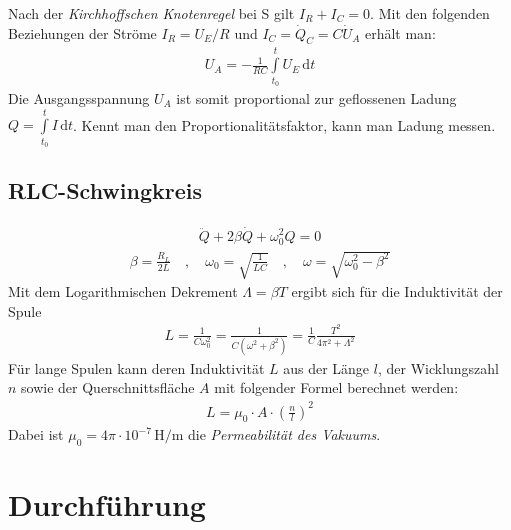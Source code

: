 \documentclass[12pt,a4paper,titlepage,headinclude,bibtotoc]{scrartcl}
\newcommand{\dif}{\ensuremath{\mathrm{d}}}
\begin{document}
Nach der \textit{Kirchhoffschen Knotenregel} bei S gilt $I_R+I_C=0$.
Mit den folgenden Beziehungen der Ströme $I_R=U_E/R$ und $I_C=\dot{Q}_C=C\dot{U}_A$ erhält man:
\begin{align}
	U_A=-\frac{1}{RC}\int \limits_{t_0}^t U_E \,\dif t
\end{align}
Die Ausgangsspannung $U_A$ ist somit proportional zur geflossenen Ladung $Q=\int \limits_{t_0}^t I \,\dif t$.
Kennt man den Proportionalitätsfaktor, kann man Ladung messen.

\subsection{RLC-Schwingkreis}

\begin{align}
	\ddot{Q}+2\beta\dot{Q}+\omega_0^2 Q=0
\end{align}
\begin{align*}
	\beta=\frac{R_L}{2L} \quad , \quad 
	\omega_0=\sqrt{\frac{1}{LC}} \quad , \quad
	\omega=\sqrt{\omega_0^2-\beta^2}
\end{align*}
Mit dem Logarithmischen Dekrement $\Lambda=\beta T$ ergibt sich für die Induktivität der Spule
\begin{align}
	L=\frac{1}{C\omega_0^2}=\frac{1}{C(\omega^2+\beta^2)}=\frac{1}{C}\frac{T^2}{4\pi^2+\Lambda^2}
	\label{eq:L}
\end{align}
Für lange Spulen kann deren Induktivität $L$ aus der Länge $l$, der Wicklungszahl $n$ sowie der Querschnittsfläche $A$ mit folgender Formel berechnet werden:
\begin{align}
	L=\mu_0 \cdot A \cdot \left(\frac{n}{l}\right)^2
	\label{eq:IndLangeSpule}
\end{align}
Dabei ist $\mu_0=4\pi\cdot 10^{-7}\, \si{\henry \per \meter}$ die \textit{Permeabilität des Vakuums}. 

\section{Durchführung}
\label{sec:durchfuehrung}
\end{document}

